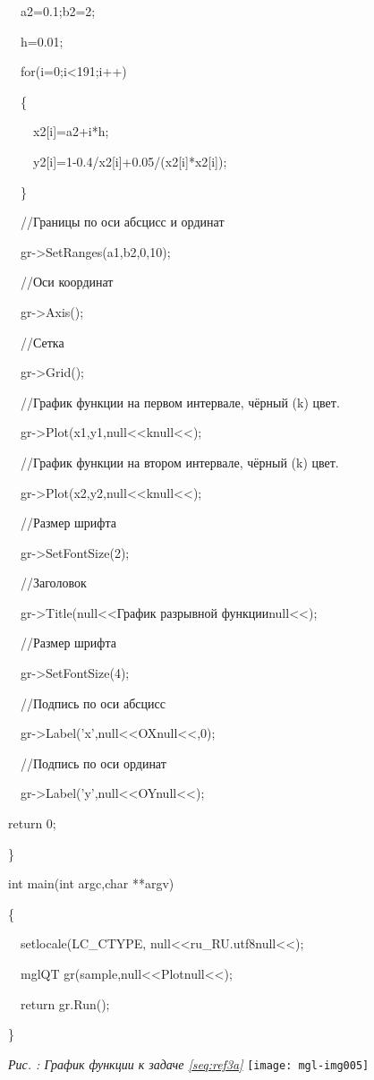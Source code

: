 \ \ a2=0.1;b2=2;

\ \ h=0.01;

\ \ for(i=0;i{\textless}191;i++)

\ \ \{

\ \ \ \ x2[i]=a2+i*h;

\ \ \ \ y2[i]=1-0.4/x2[i]+0.05/(x2[i]*x2[i]);

\ \ \}

\ \ //Границы по оси абсцисс и ординат

\ \ gr-{\textgreater}SetRanges(a1,b2,0,10);

{\upshape
\ \ //Оси координат}

\ \ gr-{\textgreater}Axis();

{\upshape
\ \ //Сетка}

\ \ gr-{\textgreater}Grid();

{\upshape
\ \ //График функции на первом интервале, чёрный (k) цвет.}

\ \ gr-{\textgreater}Plot(x1,y1,null{<<}knull{<<});

{\upshape
\ \ //График функции на втором интервале, чёрный (k) цвет.}

\ \ gr-{\textgreater}Plot(x2,y2,null{<<}knull{<<});

\ \ //Размер шрифта

{\upshape
\ \ gr-{\textgreater}SetFontSize(2);}

\ \ //Заголовок

\ \ gr-{\textgreater}Title(null{<<}График разрывной функцииnull{<<});

\ \ //Размер шрифта

\ \ gr-{\textgreater}SetFontSize(4);

\ \ //Подпись по оси абсцисс

\ \ gr-{\textgreater}Label('x',null{<<}OXnull{<<},0);

\ \ //Подпись по оси ординат

\ \  gr-{\textgreater}Label('y',null{<<}OYnull{<<});

return 0;

\}

int main(int argc,char **argv)

\{

\ \ setlocale(LC\_CTYPE, null{<<}ru\_RU.utf8null{<<});

\ \ mglQT gr(sample,null{<<}Plotnull{<<});

\ \ return gr.Run();

\}

\begin{minipage}{15.956cm}
{\itshape
Рис. {\theqwertya\label{seq:ref4}}: График функции к задаче \ref{seq:ref3a}}
\texttt{[image: mgl-img005]}\end{minipage}

